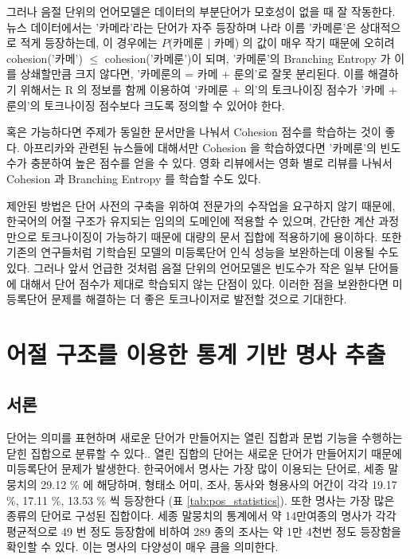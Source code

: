\documentclass[oneside, ko,phd]{snuthesis_utf8_kor}
\begin{document}
그러나 음절 단위의 언어모델은 데이터의 부분단어가 모호성이 없을 때 잘 작동한다.
뉴스 데이터에서는 '카메라'라는 단어가 자주 등장하며 나라 이름 '카메룬'은 상대적으로 적게 등장하는데, 이 경우에는 $P$(카메룬 $\vert$ 카메) 의 값이 매우 작기 때문에 오히려 cohesion('카메') $\le$ cohesion('카메룬')이 되며, '카메룬'의 Branching Entropy 가 이를 상쇄할만큼 크지 않다면, '카메룬의 = 카메 + 룬의'로 잘못 분리된다.
이를 해결하기 위해서는 R 의 정보를 함께 이용하여 '카메룬 + 의'의 토크나이징 점수가 '카메 + 룬의'의 토크나이징 점수보다 크도록 정의할 수 있어야 한다.

혹은 가능하다면 주제가 동일한 문서만을 나눠서 Cohesion 점수를 학습하는 것이 좋다.
아프리카와 관련된 뉴스들에 대해서만 Cohesion 을 학습하였다면 '카메룬'의 빈도수가 충분하여 높은 점수를 얻을 수 있다.
영화 리뷰에서는 영화 별로 리뷰를 나눠서 Cohesion 과 Branching Entropy 를 학습할 수도 있다.

제안된 방법은 단어 사전의 구축을 위하여 전문가의 수작업을 요구하지 않기 때문에, 한국어의 어절 구조가 유지되는 임의의 도메인에 적용할 수 있으며, 간단한 계산 과정만으로 토크나이징이 가능하기 때문에 대량의 문서 집합에 적용하기에 용이하다.
또한 기존의 \cite{zhao2007incorporating, zhao2011integrating, zheng2013deep} 연구들처럼 기학습된 모델의 미등록단어 인식 성능을 보완하는데 이용될 수도 있다.
그러나 앞서 언급한 것처럼 음절 단위의 언어모델은 빈도수가 작은 일부 단어들에 대해서 단어 점수가 제대로 학습되지 않는 단점이 있다.
이러한 점을 보완한다면 미등록단어 문제를 해결하는 더 좋은 토크나이저로 발전할 것으로 기대한다.


\newpage
\chapter{어절 구조를 이용한 통계 기반 명사 추출} \label{noun_extraction}

\section{서론}

단어는 의미를 표현하며 새로운 단어가 만들어지는 열린 집합과 문법 기능을 수행하는 닫힌 집합으로 분류할 수 있다.\cite{jurafsky2000speech}.
열린 집합의 단어는 새로운 단어가 만들어지기 때문에 미등록단어 문제가 발생한다.
한국어에서 명사는 가장 많이 이용되는 단어로, 세종 말뭉치의 29.12 \% 에 해당하며, 형태소 어미, 조사, 동사와 형용사의 어간이 각각 19.17 \%, 17.11 \%, 13.53 \% 씩 등장한다 (표 \ref{tab:pos_statistics}).
또한 명사는 가장 많은 종류의 단어로 구성된 집합이다.
세종 말뭉치의 통계에서 약 14만여종의 명사가 각각 평균적으로 49 번 정도 등장함에 비하여 289 종의 조사는 약 1만 4천번 정도 등장함을 확인할 수 있다.
이는 명사의 다양성이 매우 큼을 의미한다.
\end{document}
